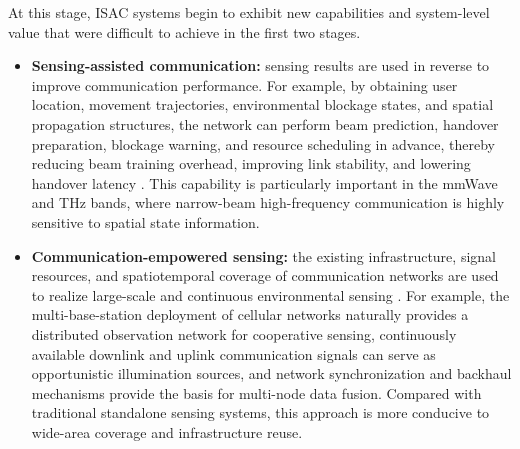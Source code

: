 At this stage, ISAC systems begin to exhibit new capabilities and system-level value that were difficult to achieve in the first two stages.
\begin{itemize}
    \item \textbf{Sensing-assisted communication:} sensing results are used in reverse to improve communication performance. For example, by obtaining user location, movement trajectories, environmental blockage states, and spatial propagation structures, the network can perform beam prediction, handover preparation, blockage warning, and resource scheduling in advance, thereby reducing beam training overhead, improving link stability, and lowering handover latency \cite{Liu2022ISAC,Zhang2020perceptive}. This capability is particularly important in the mmWave and THz bands, where narrow-beam high-frequency communication is highly sensitive to spatial state information.
    
    \item \textbf{Communication-empowered sensing:} the existing infrastructure, signal resources, and spatiotemporal coverage of communication networks are used to realize large-scale and continuous environmental sensing \cite{Liu2022ISAC,Gonzalez2024integrated}. For example, the multi-base-station deployment of cellular networks naturally provides a distributed observation network for cooperative sensing, continuously available downlink and uplink communication signals can serve as opportunistic illumination sources, and network synchronization and backhaul mechanisms provide the basis for multi-node data fusion. Compared with traditional standalone sensing systems, this approach is more conducive to wide-area coverage and infrastructure reuse.
    

\end{itemize}
